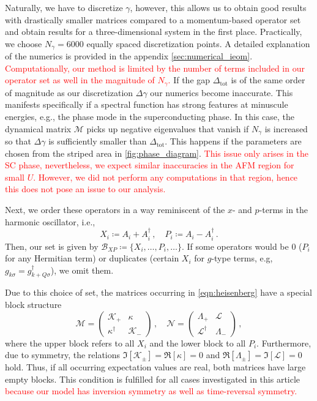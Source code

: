 \documentclass[
    reprint, 
    aps,
    preprintnumbers,
    twocolumn,
    prb,
    superscriptaddress
]{revtex4-2}
\newcommand{\mM}{\mathcal{M}}
\newcommand{\mN}{\mathcal{N}}
\begin{document}
Naturally, we have to discretize $\gamma$, 
however, this allows us to obtain good results with drastically smaller matrices compared to a momentum-based operator set and obtain results for a three-dimensional system in the first place.
Practically, we choose $N_\gamma = 6000$ equally spaced discretization points.
A detailed explanation of the numerics is provided in the appendix \ref{sec:numerical_ieom}.
\textcolor{red}{Computationally, our method is limited by the number of terms included in our operator set as well in the magnitude of $N_\gamma$.}
If the gap $\Delta_\text{tot}$ is of the same order of magnitude as our discretization $\Delta \gamma$ our numerics become inaccurate.
This manifests specifically if a spectral function has strong features at minuscule energies, e.g., the phase mode in the superconducting phase.
In this case, the dynamical matrix $\mM$ picks up negative eigenvalues that vanish if $N_\gamma$ is increased so that $\Delta \gamma$ is sufficiently smaller than $\Delta_\text{tot}$.
This happens if the parameters are chosen from the striped area in \autoref{fig:phase_diagram}.
\textcolor{red}{This issue only arises in the SC phase, nevertheless, we expect similar inaccuracies in the AFM region for small $U$.
However, we did not perform any computations in that region, hence this does not pose an issue to our analysis.}

Next, we order these operators in a way reminiscent of the $x$- and $p$-terms in the harmonic oscillator, i.e.,
\begin{equation}
    X_i \coloneqq  A_i + A_i^\dagger\,,\quad P_i \coloneqq  A_i - A_i^\dagger\,.
\end{equation}
Then, our set is given by $\mathcal{B}_{XP} \coloneqq \{ X_i, \ldots, P_i, \ldots \}$.
If some operators would be 0 ($P_i$ for any Hermitian term) or duplicates (certain $X_i$ for $g$-type terms, e.g, $g_{k\sigma} = g_{k+Q\sigma}^\dagger$), we omit them.

Due to this choice of set, the matrices occurring in \eqref{eqn:heisenberg} have a special block structure
\begin{equation}
    \label{eqn:xp_set}
    \mM = \begin{pmatrix}
        \mathcal{K}_+ & \kappa \\ \kappa^\dagger & \mathcal{K}_-
    \end{pmatrix}\,,\quad \mN = \begin{pmatrix}
        \Lambda_+ & \mathcal{L} \\ \mathcal{L}^\dagger & \Lambda_-
    \end{pmatrix}\,,
\end{equation}
where the upper block refers to all $X_i$ and the lower block to all $P_i$.
Furthermore, due to symmetry, the relations $\Im [\mathcal{K}_\pm] = \Re [\kappa] = 0$ and $\Re [\Lambda_\pm] = \Im [\mathcal{L}] = 0$ hold.
Thus, if all occurring expectation values are real, both matrices have large empty blocks.
This condition is fulfilled for all cases investigated in this article \textcolor{red}{because our model has inversion symmetry as well as time-reversal symmetry.}
\end{document}
